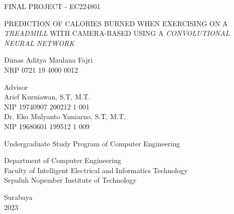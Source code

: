 \begin{large}
  FINAL PROJECT - EC224801
\end{large}

\vspace{\fill}

\begin{spacing}{1.5}
  \begin{Large}
    PREDICTION OF CALORIES BURNED WHEN EXERCISING ON A 
    \emph{TREADMILL} WITH CAMERA-BASED
    USING A \emph{CONVOLUTIONAL NEURAL NETWORK}
  \end{Large}
\end{spacing}

\vspace{\fill}

\begin{large}
  Dimas Aditya Maulana Fajri \\
  \textmd{NRP 0721 19 4000 0012}
\end{large}

\vspace{\fill}

\begin{large}
  \textmd{Advisor} \\
  Arief Kurniawan, S.T, M.T. \\
  \textmd{NIP 19740907 200212 1 001} \\
  Dr. Eko Mulyanto Yuniarno, S.T, M.T. \\
  \textmd{NIP 19680601 199512 1 009}
\end{large}

\vspace{\fill}

Undergraduate Study Program of Computer Engineering \\

\mdseries

Department of Computer Engineering \\
Faculty of Intelligent Electrical and Informatics Technology \\
Sepuluh Nopember Institute of Technology

Surabaya \\
2023

